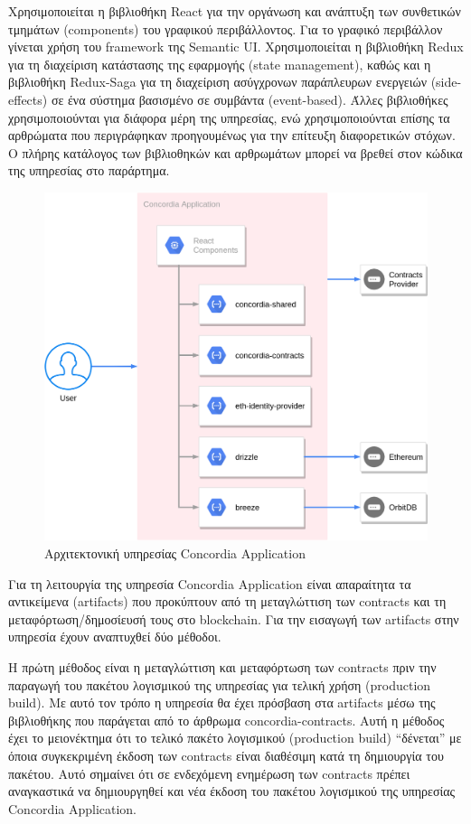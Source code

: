 Χρησιμοποιείται η βιβλιοθήκη React για την οργάνωση και ανάπτυξη των συνθετικών τμημάτων (components) του γραφικού περιβάλλοντος. Για το γραφικό περιβάλλον γίνεται χρήση του framework της Semantic UI. Χρησιμοποιείται η βιβλιοθήκη Redux για τη διαχείριση κατάστασης της εφαρμογής (state management), %
καθώς και η βιβλιοθήκη Redux-Saga για τη διαχείριση ασύγχρονων παράπλευρων ενεργειών (side-effects) σε ένα σύστημα βασισμένο σε συμβάντα (event-based). Άλλες βιβλιοθήκες χρησιμοποιούνται για διάφορα μέρη της υπηρεσίας, ενώ χρησιμοποιούνται επίσης τα αρθρώματα που περιγράφηκαν προηγουμένως για την επίτευξη διαφορετικών στόχων. Ο πλήρης κατάλογος των βιβλιοθηκών και αρθρωμάτων μπορεί να βρεθεί στον κώδικα της υπηρεσίας στο παράρτημα. %

\begin{figure}[H]
    \centering
    \includegraphics[width=.7\textwidth]{assets/figures/chapter-4/4.3.architecture-4.3.2.concordia-application-architecture.png}
    \caption{Αρχιτεκτονική υπηρεσίας Concordia Application}
    \label{figure:4-3-concordia-application-architecture}
\end{figure}

Για τη λειτουργία της υπηρεσία Concordia Application είναι απαραίτητα τα αντικείμενα (artifacts) που προκύπτουν από τη μεταγλώττιση των contracts και τη μεταφόρτωση/δημοσίευσή τους στο blockchain. Για την εισαγωγή των artifacts στην υπηρεσία έχουν αναπτυχθεί δύο μέθοδοι.

Η πρώτη μέθοδος είναι η μεταγλώττιση και μεταφόρτωση των contracts πριν την παραγωγή του πακέτου λογισμικού της υπηρεσίας για τελική χρήση (production build). Με αυτό τον τρόπο η υπηρεσία θα έχει πρόσβαση στα artifacts μέσω της βιβλιοθήκης που παράγεται από το άρθρωμα concordia-contracts. Αυτή η μέθοδος έχει το μειονέκτημα ότι το τελικό πακέτο λογισμικού (production build) ``δένεται'' με όποια συγκεκριμένη έκδοση των contracts είναι διαθέσιμη κατά τη δημιουργία του πακέτου. Αυτό σημαίνει ότι σε ενδεχόμενη ενημέρωση των contracts πρέπει αναγκαστικά να δημιουργηθεί και νέα έκδοση του πακέτου λογισμικού της υπηρεσίας Concordia Application.


